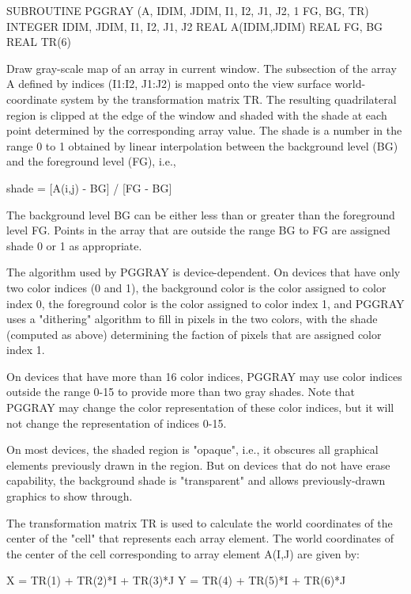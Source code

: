 {\eightpoint\begintt
      SUBROUTINE PGGRAY (A, IDIM, JDIM, I1, I2, J1, J2,
     1                   FG, BG, TR)
      INTEGER IDIM, JDIM, I1, I2, J1, J2
      REAL    A(IDIM,JDIM)
      REAL    FG, BG
      REAL TR(6)
 
Draw gray-scale map of an array in current window. The subsection
of the array A defined by indices (I1:I2, J1:J2) is mapped onto
the view surface world-coordinate system by the transformation
matrix TR. The resulting quadrilateral region is clipped at the edge
of the window and shaded with the shade at each point determined
by the corresponding array value.  The shade is a number in the
range 0 to 1 obtained by linear interpolation between the background
level (BG) and the foreground level (FG), i.e.,
 
  shade = [A(i,j) - BG] / [FG - BG]
 
The background level BG can be either less than or greater than the
foreground level FG.  Points in the array that are outside the range
BG to FG are assigned shade 0 or 1 as appropriate.
 
The algorithm used by PGGRAY is device-dependent.  On devices
that have only two color indices (0 and 1), the background color
is the color assigned to color index 0, the foreground color
is the color assigned to color index 1, and PGGRAY uses a
"dithering" algorithm to fill in pixels in the two colors, with
the shade (computed as above) determining the faction of pixels
that are assigned color index 1.
 
On devices that have more than 16 color indices, PGGRAY may use
color indices outside the range 0-15 to provide more than two
gray shades.  Note that PGGRAY may change the color representation
of these color indices, but it will not change the representation
of indices 0-15.
 
On most devices, the shaded region is "opaque", i.e., it obscures
all graphical elements previously drawn in the region. But on
devices that do not have erase capability, the background shade
is "transparent" and allows previously-drawn graphics to show
through.
 
The transformation matrix TR is used to calculate the world
coordinates of the center of the "cell" that represents each
array element. The world coordinates of the center of the cell
corresponding to array element A(I,J) are given by:
 
         X = TR(1) + TR(2)*I + TR(3)*J
         Y = TR(4) + TR(5)*I + TR(6)*J
 
}
